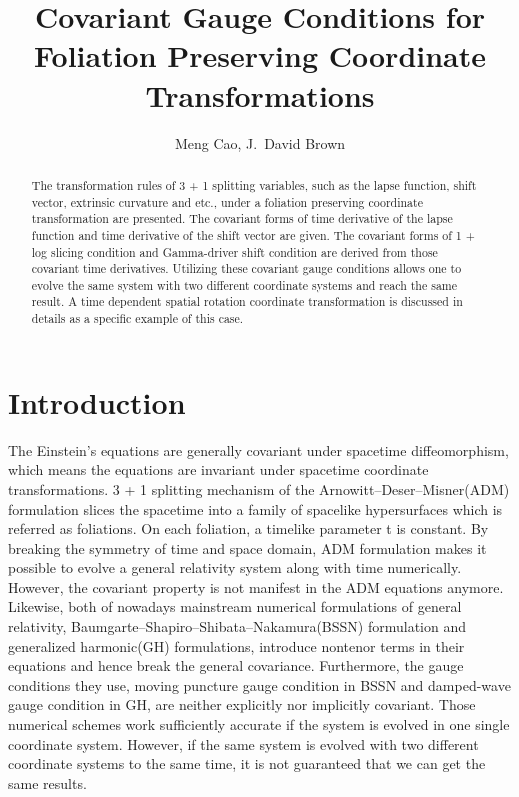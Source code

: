 \documentclass[letterpaper,nofootinbib,prd,amsmath,onecolumn]{revtex4-1}
\begin{document}

\title{Covariant Gauge Conditions for Foliation Preserving Coordinate Transformations}
\author{Meng Cao, J.~David Brown}

\begin{abstract}
The transformation rules of 3 + 1 splitting variables, such as the lapse function, shift vector, extrinsic curvature and etc., under a foliation preserving coordinate transformation are presented. The covariant forms of time derivative of the lapse function and time derivative of the shift vector are given. The covariant forms of 1 + log slicing condition and Gamma-driver shift condition are derived from those covariant time derivatives. Utilizing these covariant gauge conditions allows one to evolve the same system with two different coordinate systems and reach the same result. A time dependent spatial rotation coordinate transformation is discussed in details as a specific example of this case.  
\end{abstract}
\maketitle

\section{Introduction}
The Einstein's equations are generally covariant under spacetime diffeomorphism, which means the equations are invariant under spacetime coordinate transformations. 3 + 1 splitting mechanism of the Arnowitt--Deser--Misner(ADM) formulation\cite{ADM:Witten} slices the spacetime into a family of spacelike hypersurfaces which is referred as foliations. On each foliation, a timelike parameter t is constant. By breaking the symmetry of time and space domain, ADM formulation makes it possible to evolve a general relativity system along with time numerically. However, the covariant property is not manifest in the ADM equations anymore. Likewise, both of nowadays mainstream numerical formulations of general relativity, Baumgarte--Shapiro--Shibata--Nakamura(BSSN) formulation\cite{Shibata:1995we,Baumgarte:1998te} and generalized harmonic(GH) formulations\cite{Friedrich:1985,Garfinkle:2001ni, Pretorius:2006tp,Lindblom:2005qh}, introduce nontenor terms in their equations and hence break the general covariance. Furthermore, the gauge conditions they use, moving puncture gauge condition\cite{Bona:1994dr,Alcubierre:2002kk} in BSSN and damped-wave gauge condition\cite{Szilagyi:2009qz} in GH, are neither explicitly nor implicitly covariant. Those numerical schemes work sufficiently accurate if the system is evolved in one single coordinate system. However, if the same system is evolved with two different coordinate systems to the same time, it is not guaranteed that we can get the same results.
\end{document}
